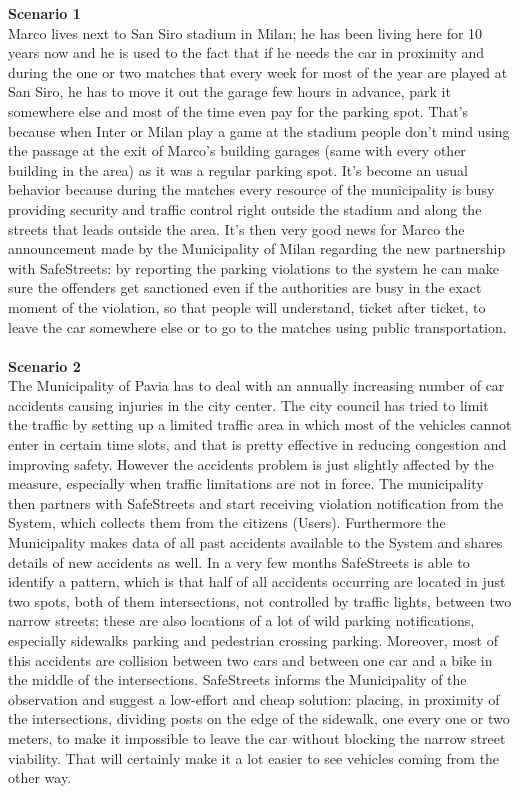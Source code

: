 \documentclass {article}
\begin{document}
		{\bf Scenario 1}\\
		Marco lives next to San Siro stadium in Milan; he has been living here for 10 years now and he is used to the fact that if he needs the car in proximity and during the one or two matches that every week for most of the year are played at San Siro, he has to move it out the garage few hours in advance, park it somewhere else and most of the time even pay for the parking spot. That’s because when Inter or Milan play a game at the stadium people don’t mind using the passage at the exit of Marco’s building garages (same with every other building in the area) as it was a regular parking spot. It’s become an usual behavior because during the matches every resource of the municipality is busy providing security and traffic control right outside the stadium and along the streets that leads outside the area. It’s then very good news for Marco the announcement made by the Municipality of Milan regarding the new partnership with SafeStreets: by reporting the parking violations to the system he can make sure the offenders get sanctioned even if the authorities are busy in the exact moment of the violation, so that people will understand, ticket after ticket, to leave the car somewhere else or to go to the matches using public transportation.\\ \\
		{\bf Scenario 2}\\
		The Municipality of Pavia has to deal with an annually increasing number of car accidents causing injuries in the city center. The city council has tried to limit the traffic by setting up a limited traffic area in which most of the vehicles cannot enter in certain time slots, and that is pretty effective in reducing congestion and improving safety. However the accidents problem is just slightly affected by the measure, especially when traffic limitations are not in force. The municipality then partners with SafeStreets and start receiving violation notification from the System, which collects them from the citizens (Users). Furthermore the Municipality makes data of all past accidents available to the System and shares details of new accidents as well. In a very few months SafeStreets is able to identify a pattern, which is that half of all accidents occurring are located in just two spots, both of them intersections, not controlled by traffic lights, between two narrow streets; these are also locations of a lot of wild parking notifications, especially sidewalks parking and pedestrian crossing parking. Moreover, most of this accidents are collision between two cars and between one car and a bike in the middle of the intersections. SafeStreets informs the Municipality of the observation and suggest a low-effort and cheap solution: placing, in proximity of the intersections, dividing posts on the edge of the sidewalk, one every one or two meters, to make it impossible to leave the car without blocking the narrow street viability. That will certainly make it a lot easier to see vehicles coming from the other way.\\ \\ \\ \\ \\
\end{document}
